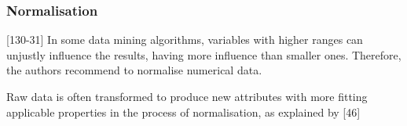 


\subsubsection{Normalisation}

\textcite{DataMiningAndPredictiveAnalytics}[130-31] 
In some data mining algorithms, variables with higher ranges can unjustly influence the results, having more influence than smaller ones. Therefore, the authors recommend to normalise numerical data. 

Raw data is often transformed to produce new attributes with more fitting applicable properties in the process of normalisation, as explained by \textcite{dataPreprocessingInDataMining}[46] 


